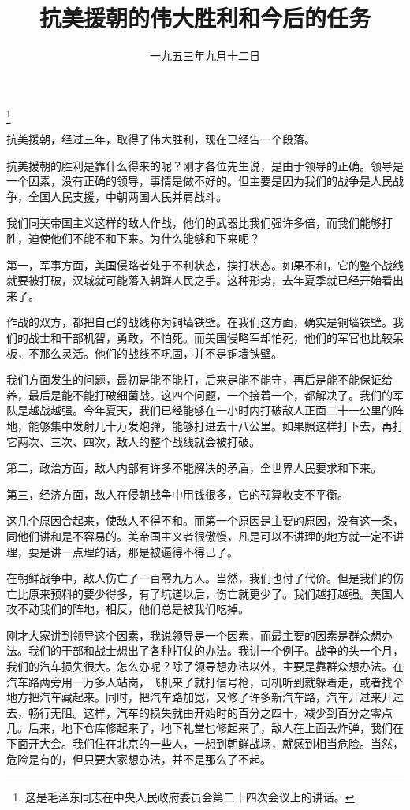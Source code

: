 
\title{抗美援朝的伟大胜利和今后的任务}
\date{一九五三年九月十二日}
\thanks{这是毛泽东同志在中央人民政府委员会第二十四次会议上的讲话。}
\maketitle


抗美援朝，经过三年，取得了伟大胜利，现在已经告一个段落。

抗美援朝的胜利是靠什么得来的呢？刚才各位先生说，是由于领导的正确。领导是一个因素，没有正确的领导，事情是做不好的。但主要是因为我们的战争是人民战争，全国人民支援，中朝两国人民并肩战斗。

我们同美帝国主义这样的敌人作战，他们的武器比我们强许多倍，而我们能够打胜，迫使他们不能不和下来。为什么能够和下来呢？

第一，军事方面，美国侵略者处于不利状态，挨打状态。如果不和，它的整个战线就要被打破，汉城就可能落入朝鲜人民之手。这种形势，去年夏季就已经开始看出来了。

作战的双方，都把自己的战线称为铜墙铁壁。在我们这方面，确实是铜墙铁壁。我们的战士和干部机智，勇敢，不怕死。而美国侵略军却怕死，他们的军官也比较呆板，不那么灵活。他们的战线不巩固，并不是铜墙铁壁。

我们方面发生的问题，最初是能不能打，后来是能不能守，再后是能不能保证给养，最后是能不能打破细菌战。这四个问题，一个接着一个，都解决了。我们的军队是越战越强。今年夏天，我们已经能够在一小时内打破敌人正面二十一公里的阵地，能够集中发射几十万发炮弹，能够打进去十八公里。如果照这样打下去，再打它两次、三次、四次，敌人的整个战线就会被打破。

第二，政治方面，敌人内部有许多不能解决的矛盾，全世界人民要求和下来。

第三，经济方面，敌人在侵朝战争中用钱很多，它的预算收支不平衡。

这几个原因合起来，使敌人不得不和。而第一个原因是主要的原因，没有这一条，同他们讲和是不容易的。美帝国主义者很傲慢，凡是可以不讲理的地方就一定不讲理，要是讲一点理的话，那是被逼得不得已了。

在朝鲜战争中，敌人伤亡了一百零九万人。当然，我们也付了代价。但是我们的伤亡比原来预料的要少得多，有了坑道以后，伤亡就更少了。我们越打越强。美国人攻不动我们的阵地，相反，他们总是被我们吃掉。

刚才大家讲到领导这个因素，我说领导是一个因素，而最主要的因素是群众想办法。我们的干部和战士想出了各种打仗的办法。我讲一个例子。战争的头一个月，我们的汽车损失很大。怎么办呢？除了领导想办法以外，主要是靠群众想办法。在汽车路两旁用一万多人站岗，飞机来了就打信号枪，司机听到就躲着走，或者找个地方把汽车藏起来。同时，把汽车路加宽，又修了许多新汽车路，汽车开过来开过去，畅行无阻。这样，汽车的损失就由开始时的百分之四十，减少到百分之零点几。后来，地下仓库修起来了，地下礼堂也修起来了，敌人在上面丢炸弹，我们在下面开大会。我们住在北京的一些人，一想到朝鲜战场，就感到相当危险。当然，危险是有的，但只要大家想办法，并不是那么了不起。

